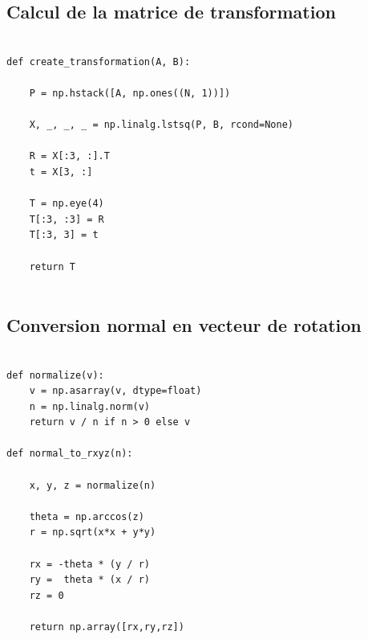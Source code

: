 \documentclass[a4paper,11pt]{article}
\begin{document}
\subsection{Calcul de la matrice de transformation}
\begin{lstlisting}

def create_transformation(A, B):

    P = np.hstack([A, np.ones((N, 1))])

    X, _, _, _ = np.linalg.lstsq(P, B, rcond=None)

    R = X[:3, :].T
    t = X[3, :]

    T = np.eye(4)
    T[:3, :3] = R
    T[:3, 3] = t
    
    return T


\end{lstlisting}

\subsection{Conversion normal en vecteur de rotation}
\begin{lstlisting}

def normalize(v):
    v = np.asarray(v, dtype=float)
    n = np.linalg.norm(v)
    return v / n if n > 0 else v

def normal_to_rxyz(n):

    x, y, z = normalize(n)

    theta = np.arccos(z)
    r = np.sqrt(x*x + y*y)

    rx = -theta * (y / r)
    ry =  theta * (x / r)
    rz = 0

    return np.array([rx,ry,rz])

\end{lstlisting}
\end{document}
